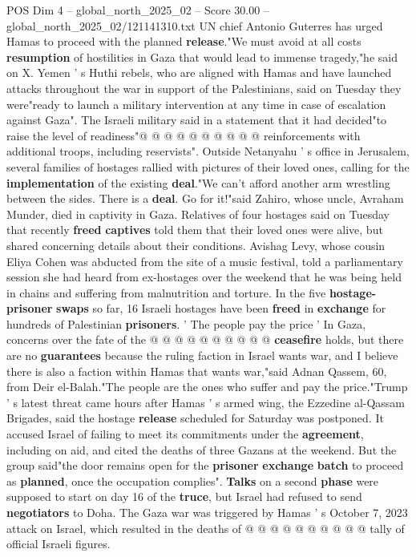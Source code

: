 \begin{textsample}{POS Dim 4 – global\_north\_2025\_02 – Score 30.00 – global\_north\_2025\_02/121141310.txt}
UN chief Antonio Guterres has urged Hamas to proceed with the planned \textbf{release}."We must avoid at all costs \textbf{resumption} of hostilities in Gaza that would lead to immense tragedy,"he said on X.
Yemen ' s Huthi rebels, who are aligned with Hamas and have launched attacks throughout the war in support of the Palestinians, said on Tuesday they were"ready to launch a military intervention at any time in case of escalation against Gaza".
The Israeli military said in a statement that it had decided"to raise the level of readiness"@ @ @ @ @ @ @ @ @ @ reinforcements with additional troops, including reservists".
Outside Netanyahu ' s office in Jerusalem, several families of hostages rallied with pictures of their loved ones, calling for the \textbf{implementation} of the existing \textbf{deal}."We can't afford another arm wrestling between the sides.
There is a \textbf{deal}.
Go for it!"said Zahiro, whose uncle, Avraham Munder, died in captivity in Gaza.
Relatives of four hostages said on Tuesday that recently \textbf{freed} \textbf{captives} told them that their loved ones were alive, but shared concerning details about their conditions.
Avishag Levy, whose cousin Eliya Cohen was abducted from the site of a music festival, told a parliamentary session she had heard from ex-hostages over the weekend that he was being held in chains and suffering from malnutrition and torture.
In the five \textbf{hostage-prisoner} \textbf{swaps} so far, 16 Israeli hostages have been \textbf{freed} in \textbf{exchange} for hundreds of Palestinian \textbf{prisoners}. ' The people pay the price ' In Gaza, concerns over the fate of the @ @ @ @ @ @ @ @ @ @ \textbf{ceasefire} holds, but there are no \textbf{guarantees} because the ruling faction in Israel wants war, and I believe there is also a faction within Hamas that wants war,"said Adnan Qassem, 60, from Deir el-Balah."The people are the ones who suffer and pay the price."Trump ' s latest threat came hours after Hamas ' s armed wing, the Ezzedine al-Qassam Brigades, said the hostage \textbf{release} scheduled for Saturday was postponed.
It accused Israel of failing to meet its commitments under the \textbf{agreement}, including on aid, and cited the deaths of three Gazans at the weekend.
But the group said"the door remains open for the \textbf{prisoner} \textbf{exchange} \textbf{batch} to proceed as \textbf{planned}, once the occupation complies". \textbf{Talks} on a second \textbf{phase} were supposed to start on day 16 of the \textbf{truce}, but Israel had refused to send \textbf{negotiators} to Doha.
The Gaza war was triggered by Hamas ' s October 7, 2023 attack on Israel, which resulted in the deaths of @ @ @ @ @ @ @ @ @ @ tally of official Israeli figures.

\end{textsample}
